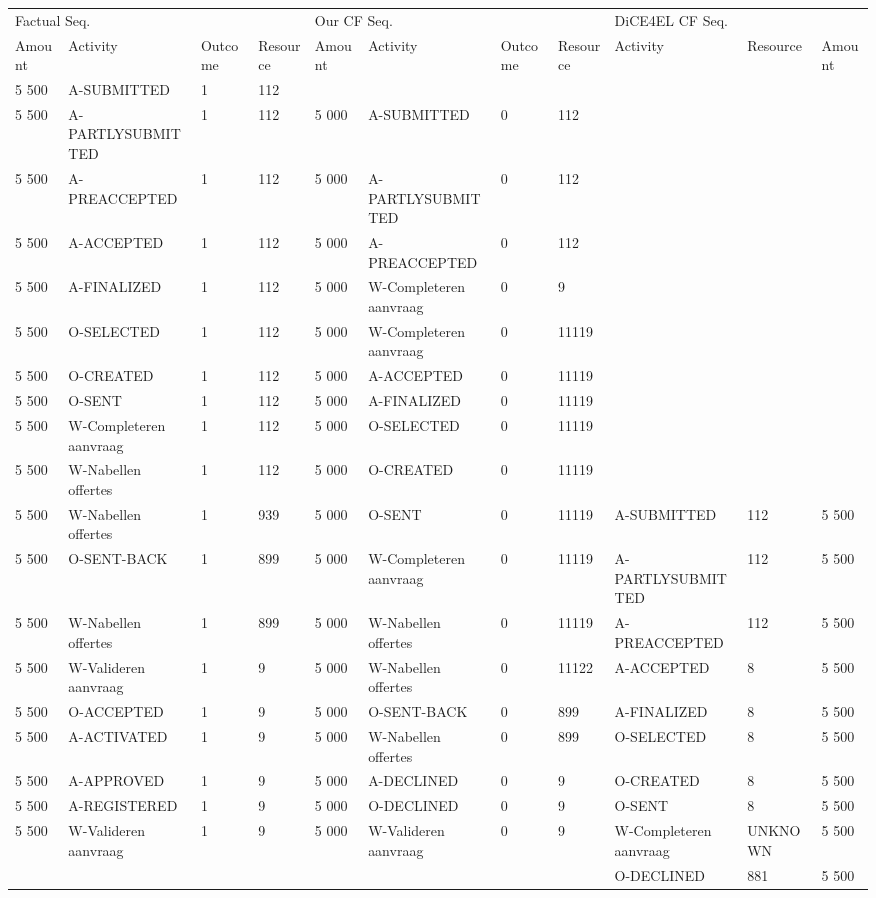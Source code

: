 \begin{tabular}{lllllllllll}
\toprule
\multicolumn{4}{l}{Factual Seq.} & \multicolumn{4}{l}{Our CF Seq.} & \multicolumn{3}{l}{DiCE4EL CF Seq.} \\
Amount & Activity & Outcome & Resource & Amount & Activity & Outcome & Resource & Activity & Resource & Amount \\
\midrule
5 500 & A-SUBMITTED & 1 & 112 &  &  &  &  &  &  &  \\
5 500 & A-PARTLYSUBMITTED & 1 & 112 & 5 000 & A-SUBMITTED & 0 & 112 &  &  &  \\
5 500 & A-PREACCEPTED & 1 & 112 & 5 000 & A-PARTLYSUBMITTED & 0 & 112 &  &  &  \\
5 500 & A-ACCEPTED & 1 & 112 & 5 000 & A-PREACCEPTED & 0 & 112 &  &  &  \\
5 500 & A-FINALIZED & 1 & 112 & 5 000 & W-Completeren aanvraag & 0 & 9 &  &  &  \\
5 500 & O-SELECTED & 1 & 112 & 5 000 & W-Completeren aanvraag & 0 & 11119 &  &  &  \\
5 500 & O-CREATED & 1 & 112 & 5 000 & A-ACCEPTED & 0 & 11119 &  &  &  \\
5 500 & O-SENT & 1 & 112 & 5 000 & A-FINALIZED & 0 & 11119 &  &  &  \\
5 500 & W-Completeren aanvraag & 1 & 112 & 5 000 & O-SELECTED & 0 & 11119 &  &  &  \\
5 500 & W-Nabellen offertes & 1 & 112 & 5 000 & O-CREATED & 0 & 11119 &  &  &  \\
5 500 & W-Nabellen offertes & 1 & 939 & 5 000 & O-SENT & 0 & 11119 & A-SUBMITTED & 112 & 5 500 \\
5 500 & O-SENT-BACK & 1 & 899 & 5 000 & W-Completeren aanvraag & 0 & 11119 & A-PARTLYSUBMITTED & 112 & 5 500 \\
5 500 & W-Nabellen offertes & 1 & 899 & 5 000 & W-Nabellen offertes & 0 & 11119 & A-PREACCEPTED & 112 & 5 500 \\
5 500 & W-Valideren aanvraag & 1 & 9 & 5 000 & W-Nabellen offertes & 0 & 11122 & A-ACCEPTED & 8 & 5 500 \\
5 500 & O-ACCEPTED & 1 & 9 & 5 000 & O-SENT-BACK & 0 & 899 & A-FINALIZED & 8 & 5 500 \\
5 500 & A-ACTIVATED & 1 & 9 & 5 000 & W-Nabellen offertes & 0 & 899 & O-SELECTED & 8 & 5 500 \\
5 500 & A-APPROVED & 1 & 9 & 5 000 & A-DECLINED & 0 & 9 & O-CREATED & 8 & 5 500 \\
5 500 & A-REGISTERED & 1 & 9 & 5 000 & O-DECLINED & 0 & 9 & O-SENT & 8 & 5 500 \\
5 500 & W-Valideren aanvraag & 1 & 9 & 5 000 & W-Valideren aanvraag & 0 & 9 & W-Completeren aanvraag & UNKNOWN & 5 500 \\
 &  &  &  &  &  &  &  & O-DECLINED & 881 & 5 500 \\
\bottomrule
\end{tabular}
